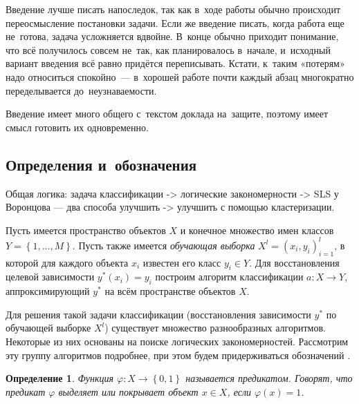 \documentclass[12pt]{article}
\newtheorem{definition}{Определение}
\begin{document}
Введение лучше писать напоследок, так как в~ходе работы обычно
происходит переосмысление постановки задачи.  Если же введение писать,
когда работа еще не~готова, задача усложняется вдвойне.  В~конце
обычно приходит понимание, что всё получилось совсем не~так, как
планировалось в~начале, и~исходный вариант введения всё равно придётся
переписывать.  Кстати, к~таким «потерям» надо относиться спокойно~---
в~хорошей работе почти каждый абзац многократно переделывается
до~неузнаваемости.

Введение имеет много общего с~текстом доклада на~защите, поэтому имеет
смысл готовить их одновременно.

\subsection{Определения и~обозначения}




Общая логика: задача классификации -> логические закономерности -> SLS
у Воронцова --- два способа улучшить -> улучшить с помощью
кластеризации.

Пусть имеется пространство объектов \(X\) и конечное множество имен
классов \(Y = \left\{1, \dots, M\right\}\). Пусть также имеется
\emph{обучающая выборка} \(X^{l} = (x_i, y_i)_{i = 1}^{l}\), в которой
для каждого объекта \(x_i\) известен его класс \(y_i \in Y\).  Для
восстановления целевой зависимости \(y^{*}(x_i) = y_i\) построим
алгоритм классификации \(a\colon X \rightarrow Y\), аппроксимирующий
\(y^{*}\) на всём пространстве объектов \(X\).

Для решения такой задачи классификации (восстановления зависимости
\(y^{*}\) по обучающей выборке \(X^l\)) существует множество
разнообразных алгоритмов. Некоторые из них основаны на поиске
логических закономерностей. Рассмотрим эту группу алгоритмов
подробнее, при этом будем придерживаться обозначений
\cite{voron10logicalgs}.

\begin{definition}
  Функция \(\varphi \colon X \rightarrow \left\{0, 1\right\}\) называется
  \emph{предикатом}. Говорят, что предикат \(\varphi\) \emph{выделяет}
  или \emph{покрывает} объект \(x \in X\), если \(\varphi(x) = 1\).
\end{definition}
\end{document}
